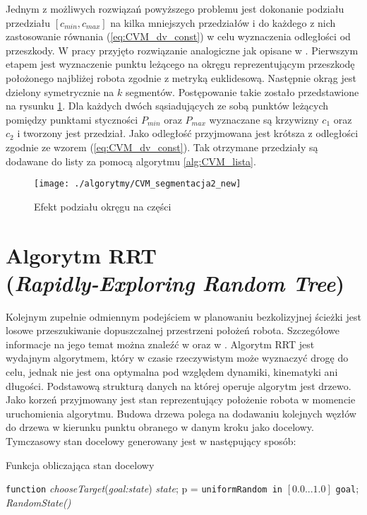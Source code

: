 	Jednym z możliwych rozwiązań powyższego problemu jest dokonanie podziału przedziału $[c_{min},c_{max}]$ na kilka
	mniejszych przedziałów i do każdego z nich zastosowanie równania (\ref{eq:CVM_dv_const}) w celu wyznaczenia odległości od przeszkody. W pracy przyjęto rozwiązanie analogiczne jak opisane w \cite{majchrowski}.
	Pierwszym etapem jest wyznaczenie punktu leżącego na okręgu reprezentującym przeszkodę położonego najbliżej robota zgodnie z  metryką euklidesową. Następnie okrąg jest dzielony symetrycznie na $k$  segmentów. Postępowanie takie zostało przedstawione na rysunku \ref{fig:CVM_segmentacja2}. 
	Dla każdych dwóch sąsiadujących ze sobą punktów leżących pomiędzy punktami styczności $P_{min}$ oraz $P_{max}$
 	wyznaczane są krzywizny $c_1$ oraz $c_2$ i tworzony jest przedział. Jako odległość przyjmowana jest krótsza 
	z odległości zgodnie ze wzorem (\ref{eq:CVM_dv_const}). Tak otrzymane przedziały są dodawane do listy za pomocą algorytmu \ref{alg:CVM_lista}.
	
	\begin{figure}[H]
	\centering
	\texttt{[image: ./algorytmy/CVM\_segmentacja2\_new]}
	\caption{ Efekt podziału okręgu na części} \label{fig:CVM_segmentacja2}
	\end{figure} 
\section{Algorytm RRT\\(\textit{Rapidly-Exploring Random Tree}) \label{sec:RRT:basic}}
Kolejnym zupełnie odmiennym podejściem w planowaniu bezkolizyjnej ścieżki jest losowe przeszukiwanie dopuszczalnej przestrzeni położeń robota. Szczegółowe informacje na
jego temat można znaleźć w \cite{RRT} oraz w \cite{RRT2}.
Algorytm RRT jest wydajnym algorytmem, który w czasie rzeczywistym może wyznaczyć drogę do celu, jednak nie jest ona optymalna pod względem dynamiki, kinematyki ani długości.
Podstawową strukturą danych na której operuje algorytm jest drzewo. Jako korzeń przyjmowany jest stan reprezentujący położenie robota w momencie uruchomienia algorytmu.
Budowa drzewa polega na dodawaniu kolejnych węzłów do drzewa w kierunku punktu obranego w danym kroku jako docelowy. Tymczasowy stan docelowy generowany jest w następujący sposób:
 \begin{algorithm}[H]
	
	\caption{ Funkcja obliczająca stan docelowy }
	\label{alg:chooseTarget}
	\begin{algorithmic}
	\STATE \texttt{function} \textit{chooseTarget}(\textit{goal:state}) \textit{state};
	\STATE p = \texttt{uniformRandom in} $[0.0 ...1.0]$
	  \RETURN  \texttt{goal};
	  \RETURN \textit{RandomState()}
	\ENDIF
	\end{algorithmic}
  \end{algorithm}

